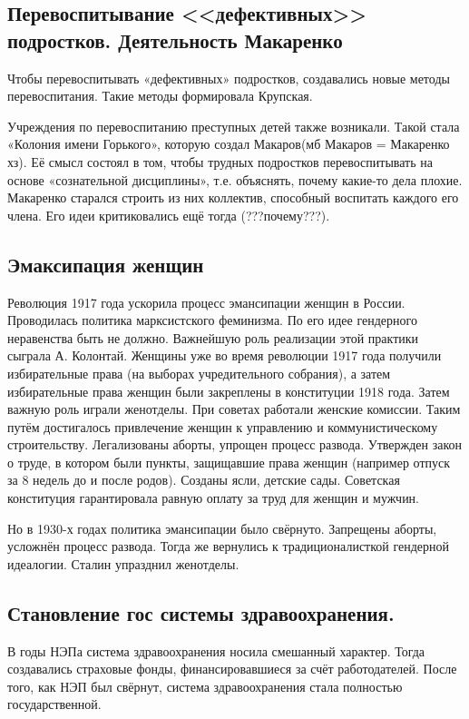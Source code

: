 \subsection{Перевоспитывание <<дефективных>> подростков. Деятельность Макаренко}

Чтобы перевоспитывать «дефективных» подростков, создавались новые методы перевоспитания. Такие методы формировала Крупская.

Учреждения по перевоспитанию преступных детей также возникали. Такой стала «Колония имени Горького», которую создал Макаров(мб Макаров = Макаренко хз). Её смысл состоял в том, чтобы трудных подростков перевоспитывать на основе «сознательной дисциплины», т.е. объяснять, почему какие-то дела плохие. Макаренко старался строить из них коллектив, способный воспитать каждого его члена. Его идеи критиковались ещё тогда (???почему???).

\subsection{Эмаксипация женщин}

Революция 1917 года ускорила процесс эмансипации женщин в России. Проводилась политика марксистского феминизма. По его идее гендерного неравенства быть не должно. Важнейшую роль реализации этой практики сыграла А. Колонтай. Женщины уже во время революции 1917 года получили избирательные права (на выборах учредительного собрания), а затем избирательные права женщин были закреплены в конституции 1918 года. Затем важную роль играли женотделы. При советах работали женские комиссии. Таким путём достигалось привлечение женщин к управлению и коммунистическому строительству. Легализованы аборты, упрощен процесс развода. Утвержден закон о труде, в котором были пункты, защищавшие права женщин (например отпуск за 8 недель до и после родов). Созданы ясли, детские сады. Советская конституция гарантировала равную оплату за труд для женщин и мужчин. 

Но в 1930-х годах политика эмансипации было свёрнуто. Запрещены аборты, усложнён процесс развода. Тогда же вернулись к традиционалисткой гендерной идеалогии. Сталин упразднил женотделы.

\subsection{Становление гос системы здравоохранения.}

 В годы НЭПа система здравоохранения носила смешанный характер. Тогда создавались страховые фонды, финансировавшиеся за счёт работодателей. После того, как НЭП был свёрнут, система здравоохранения стала полностью государственной. 
 
